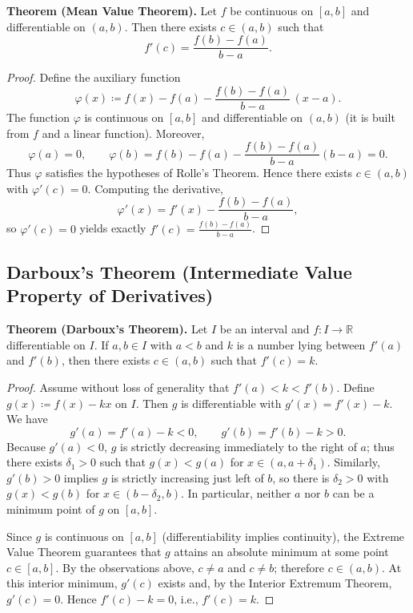 \documentclass[12pt,a4paper]{article}
\theoremstyle{definition}
\newcommand{\R}{\mathbb{R}}
\begin{document}
\textbf{Theorem (Mean Value Theorem).} Let \(f\) be continuous on \([a,b]\) and differentiable on \((a,b)\). Then there exists \(c\in(a,b)\) such that
\[
f'(c) = \frac{f(b)-f(a)}{b-a}.
\]

\begin{proof}
Define the auxiliary function
\[
\varphi(x) \coloneqq f(x) - f(a) - \frac{f(b)-f(a)}{b-a}\,(x-a).
\]
The function \(\varphi\) is continuous on \([a,b]\) and differentiable on \((a,b)\) (it is built from \(f\) and a linear function). Moreover,
\[
\varphi(a)=0,\qquad \varphi(b)=f(b)-f(a)-\frac{f(b)-f(a)}{b-a}(b-a)=0.
\]
Thus \(\varphi\) satisfies the hypotheses of Rolle's Theorem. Hence there exists \(c\in(a,b)\) with \(\varphi'(c)=0\). Computing the derivative,
\[
\varphi'(x) = f'(x) - \frac{f(b)-f(a)}{b-a},
\]
so \(\varphi'(c)=0\) yields exactly \(f'(c) = \frac{f(b)-f(a)}{b-a}\).
\end{proof}

\subsection{Darboux's Theorem (Intermediate Value Property of Derivatives)}

\textbf{Theorem (Darboux's Theorem).} Let \(I\) be an interval and \(f:I\to\R\) differentiable on \(I\). If \(a,b\in I\) with \(a<b\) and \(k\) is a number lying between \(f'(a)\) and \(f'(b)\), then there exists \(c\in(a,b)\) such that \(f'(c)=k\).

\begin{proof}
Assume without loss of generality that \(f'(a) < k < f'(b)\). Define \(g(x)\coloneqq f(x)-kx\) on \(I\). Then \(g\) is differentiable with \(g'(x)=f'(x)-k\). We have
\[
g'(a) = f'(a)-k < 0,\qquad g'(b) = f'(b)-k > 0.
\]
Because \(g'(a)<0\), \(g\) is strictly decreasing immediately to the right of \(a\); thus there exists \(\delta_1>0\) such that \(g(x)<g(a)\) for \(x\in(a,a+\delta_1)\). Similarly, \(g'(b)>0\) implies \(g\) is strictly increasing just left of \(b\), so there is \(\delta_2>0\) with \(g(x)<g(b)\) for \(x\in(b-\delta_2,b)\). In particular, neither \(a\) nor \(b\) can be a minimum point of \(g\) on \([a,b]\).

Since \(g\) is continuous on \([a,b]\) (differentiability implies continuity), the Extreme Value Theorem guarantees that \(g\) attains an absolute minimum at some point \(c\in[a,b]\). By the observations above, \(c\neq a\) and \(c\neq b\); therefore \(c\in(a,b)\). At this interior minimum, \(g'(c)\) exists and, by the Interior Extremum Theorem, \(g'(c)=0\). Hence \(f'(c)-k=0\), i.e., \(f'(c)=k\).
\end{proof}
\end{document}
